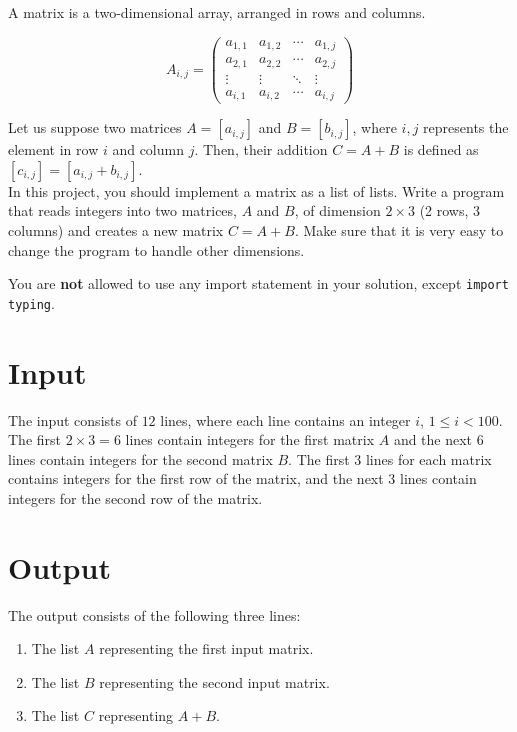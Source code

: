 
A matrix is a two-dimensional array, arranged in rows and columns.

\begin{equation*}
    A_{i,j} = 
    \begin{pmatrix}
    a_{1,1} & a_{1,2} & \cdots & a_{1,j} \\
    a_{2,1} & a_{2,2} & \cdots & a_{2,j} \\
    \vdots  & \vdots  & \ddots & \vdots  \\
    a_{i,1} & a_{i,2} & \cdots & a_{i,j} 
    \end{pmatrix}
\end{equation*}

Let us suppose two matrices $A = [a_{i,j}]$ and $B = [b_{i,j}]$, where $i,j$ represents the element in row $i$ and column $j$.
Then, their addition $C = A + B$ is defined as $[c_{i,j}] = [a_{i,j} + b_{i,j}]$. \\

In this project, you should implement a matrix as a list of lists.
Write a program that reads integers into two matrices, $A$ and $B$, of dimension $2 \times 3$ (2 rows, 3 columns) and creates a new matrix $C = A + B$.
Make sure that it is very easy to change the program to handle other dimensions.

You are \textbf{not} allowed to use any import statement in your solution, except \texttt{import typing}. \\

\section*{Input}
The input consists of $12$ lines, where each line contains an integer $i$, $1 \le i < 100$.
The first $2 \times 3 = 6$ lines contain integers for the first matrix $A$ and the next 6 lines contain integers for the second matrix $B$.
The first 3 lines for each matrix contains integers for the first row of the matrix, and the next 3 lines contain integers for the second row of the matrix.

\section*{Output}
The output consists of the following three lines:
\begin{enumerate}
    \item The list $A$ representing the first input matrix.
    \item The list $B$ representing the second input matrix.
    \item The list $C$ representing $A + B$.
    
\end{enumerate}
